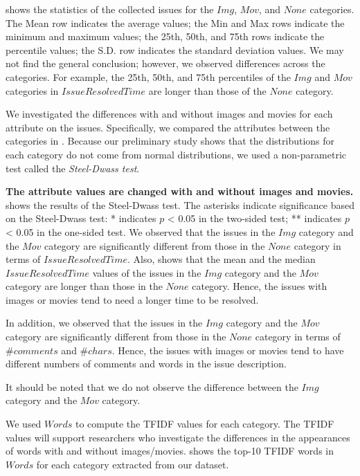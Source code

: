 

 shows the statistics
of the collected issues for the $Img$, $Mov$,
and $None$ categories.
The Mean row indicates the average values; 
the Min and Max rows indicate the minimum and maximum values; 
the 25th, 50th, and 75th rows indicate the percentile values; 
the S.D. row indicates the standard deviation values. 
We may not find the general conclusion; 
however, we observed differences across the categories. 
For example, the 25th, 50th, and 75th percentiles of 
the $Img$ and $Mov$ categories in $IssueResolvedTime$ are 
longer than those of the $None$ category. 




We investigated 
the differences with and without images and movies 
for each attribute on the issues. 
Specifically, we compared the attributes between 
the categories in . 
Because our preliminary study shows that 
the distributions for each category do not 
come from normal distributions, 
we used a non-parametric test called the \textit{Steel-Dwass test}. 

\textbf{The attribute values are changed 
with and without images and movies.}
 shows the results of 
the Steel-Dwass test. 
The asterisks indicate significance based on 
the Steel-Dwass test: * indicates $p$ < 0.05 in 
the two-sided test; 
** indicates $p$ < 0.05 in the one-sided test. 
We observed that the issues in the $Img$ category and 
the $Mov$ category are significantly different from those 
in the $None$ category in terms of $IssueResolvedTime$. 
Also,  shows that 
the mean and the median $IssueResolvedTime$ values of 
the issues in the $Img$ category and the $Mov$ category are 
longer than those in the $None$ category. 
Hence, the issues with images or movies tend to need 
a longer time to be resolved. 

In addition, we observed that the issues in 
the $Img$ category and the $Mov$ category are 
significantly different from those in 
the $None$ category in terms of $\#comments$ and 
$\#chars$. 
Hence, the issues with images or movies 
tend to have different numbers of 
comments and words in the issue description.

It should be noted that we do not observe 
the difference between the $Img$ category and 
the $Mov$ category. 





We used $Words$ to compute the TFIDF values for each category. 
The TFIDF values will support researchers who investigate 
the differences in the appearances of words with and without 
images/movies. 
 shows the top-10 TFIDF words in $Words$ 
for each category extracted from our dataset. 
